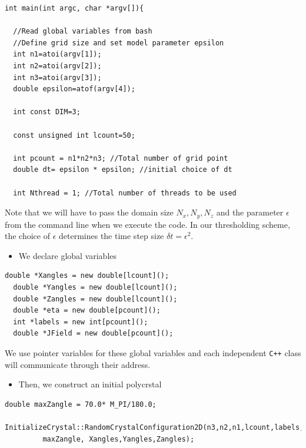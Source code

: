 \documentclass[11pt]{article}
\begin{document}
\begin{tcolorbox}
\begin{lstlisting}[basicstyle=\footnotesize]
int main(int argc, char *argv[]){

  //Read global variables from bash
  //Define grid size and set model parameter epsilon
  int n1=atoi(argv[1]);
  int n2=atoi(argv[2]);
  int n3=atoi(argv[3]);
  double epsilon=atof(argv[4]);

  int const DIM=3;

  const unsigned int lcount=50;
    
  int pcount = n1*n2*n3; //Total number of grid point
  double dt= epsilon * epsilon; //initial choice of dt
	
  int Nthread = 1; //Total number of threads to be used	

\end{lstlisting}
\end{tcolorbox}

Note that we will have to pass the domain size $N_x,N_y,N_z$
and the parameter $\epsilon$ 
from the command line when we execute the code. 
In our thresholding scheme, 
the choice of $\epsilon$ determines the time step size $\delta t =\epsilon^2$.

\begin{itemize} \item We declare global variables \end{itemize}

\begin{tcolorbox}
\begin{lstlisting}[basicstyle=\footnotesize]
  double *Xangles = new double[lcount]();
  double *Yangles = new double[lcount]();
  double *Zangles = new double[lcount]();
  double *eta = new double[pcount]();
  int *labels = new int[pcount]();
  double *JField = new double[pcount]();
\end{lstlisting}
\end{tcolorbox}

We use pointer variables for these global variables 
and each independent \texttt{C++} class 
will communicate through their address. 


\begin{itemize} \item Then, we construct an initial polycrstal \end{itemize}

\begin{tcolorbox}
\begin{lstlisting}[basicstyle=\footnotesize]
  double maxZangle = 70.0* M_PI/180.0;
  InitializeCrystal::RandomCrystalConfiguration2D(n3,n2,n1,lcount,labels, 
         maxZangle, Xangles,Yangles,Zangles);
\end{lstlisting}
\end{tcolorbox}
\end{document}
